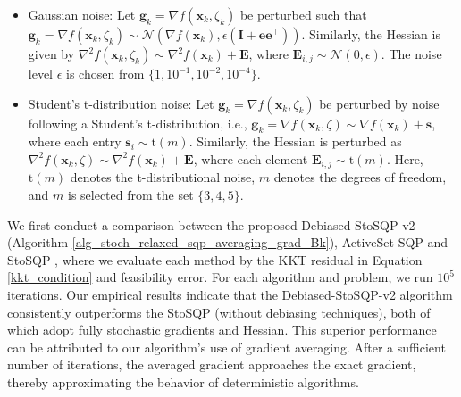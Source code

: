 \documentclass[aos]{imsart}
\numberwithin{equation}{section}
\theoremstyle{plain}
\begin{document}
\begin{itemize}
    \item Gaussian noise: Let $\bm{g}_k = \nabla f(\bm{x}_k, \zeta_k)$ be perturbed such that $\bm{g}_k = \nabla f(\bm{x}_k, \zeta_k) \sim \mathcal{N}(\nabla f(\bm{x}_k), \epsilon (\bm{I} + \bm{e} \bm{e}^{\top}))$. Similarly, the Hessian is given by $\nabla^2 f(\bm{x}_{k}, \zeta_k) \sim \nabla^2 f(\bm{x}_{k}) + \bm{E}$, where $\bm{E}_{i,j} \sim \mathcal{N}(0, \epsilon)$. The noise level $\epsilon$ is chosen from $\{1, 10^{-1}, 10^{-2}, 10^{-4} \}$. 

    \item Student's t-distribution noise: 
    Let $\bm{g}_k = \nabla f(\bm{x}_k, \zeta_k)$ be perturbed by noise following a Student's t-distribution, i.e., $\bm{g}_k = \nabla f(\bm{x}_k, \zeta) \sim \nabla f(\bm{x}_k) +  \bm{s}$, where each entry $\bm{s}_{i} \sim \text{t}(m)$. Similarly, the Hessian is perturbed as $\nabla^2 f(\bm{x}_{k}, \zeta) \sim \nabla^2 f(\bm{x}_{k}) + \bm{E}$, where each element $\bm{E}_{i,j} \sim \text{t}(m)$. Here, $\text{t}(m)$ denotes the t-distributional noise, $m$ denotes the degrees of freedom, and $m$ is selected from the set $\{3, 4, 5\}$.
\end{itemize}
We first conduct a comparison between the proposed Debiased-StoSQP-v2 (Algorithm \ref{alg_stoch_relaxed_sqp_averaging_grad_Bk}), ActiveSet-SQP \cite{na2023inequality} and StoSQP \cite{curtis2023sequential}, where we evaluate each method by the KKT residual in Equation \eqref{kkt_condition} and feasibility error. 
For each algorithm and problem, we run $10^5$ iterations. 
Our empirical results indicate that the Debiased-StoSQP-v2 algorithm consistently outperforms the StoSQP (without debiasing techniques), both of which adopt fully stochastic gradients and Hessian. 
This superior performance can be attributed to our algorithm's use of gradient averaging. 
After a sufficient number of iterations, the averaged gradient approaches the exact gradient, thereby approximating the behavior of deterministic algorithms.
\end{document}
